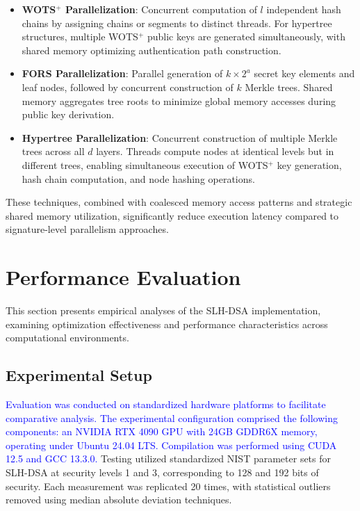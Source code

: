 \documentclass[journal]{IEEEtran}
\begin{document}
\begin{itemize}
  \item \textbf{WOTS$^+$ Parallelization}: Concurrent computation of $l$ independent hash chains by assigning chains or segments to distinct threads. For hypertree structures, multiple WOTS$^+$ public keys are generated simultaneously, with shared memory optimizing authentication path construction.

  \item \textbf{FORS Parallelization}: Parallel generation of $k \times 2^a$ secret key elements and leaf nodes, followed by concurrent construction of $k$ Merkle trees. Shared memory aggregates tree roots to minimize global memory accesses during public key derivation.

  \item \textbf{Hypertree Parallelization}: Concurrent construction of multiple Merkle trees across all $d$ layers. Threads compute nodes at identical levels but in different trees, enabling simultaneous execution of WOTS$^+$ key generation, hash chain computation, and node hashing operations.
\end{itemize}

These techniques, combined with coalesced memory access patterns and strategic shared memory utilization, significantly reduce execution latency compared to signature-level parallelism approaches.

\section{Performance Evaluation}\label{sec:evaluation}

This section presents empirical analyses of the SLH-DSA implementation, examining optimization effectiveness and performance characteristics across computational environments.

\subsection{Experimental Setup}

\textcolor{blue}{Evaluation was conducted on standardized hardware platforms to facilitate comparative analysis. The experimental configuration comprised the following components: an NVIDIA RTX 4090 GPU with 24GB GDDR6X memory, operating under Ubuntu 24.04 LTS. Compilation was performed using CUDA 12.5 and GCC 13.3.0.}
Testing utilized standardized NIST parameter sets for SLH-DSA at security levels 1 and 3, corresponding to 128 and 192 bits of security. Each measurement was replicated 20 times, with statistical outliers removed using median absolute deviation techniques.
\end{document}
